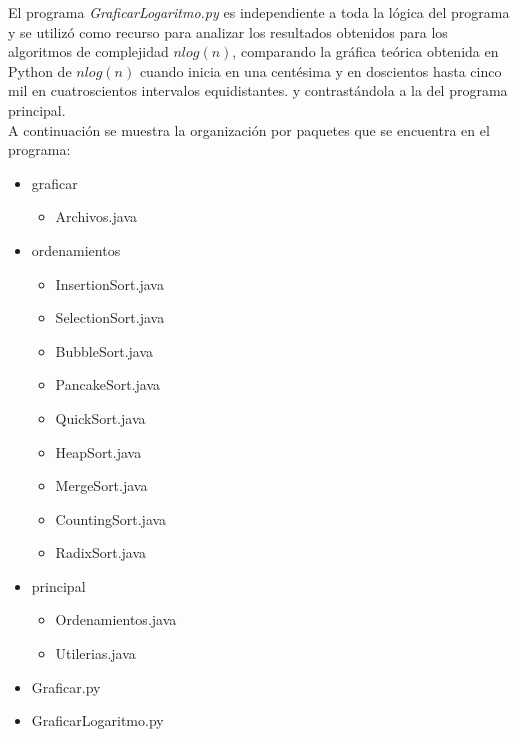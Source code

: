 \documentclass[a4paper,12pt]{article}
\begin{document}
El programa \textit{GraficarLogaritmo.py} es independiente a toda la lógica del programa y se utilizó como recurso para analizar los resultados obtenidos para los algoritmos de complejidad $n log(n)$, comparando la gráfica teórica obtenida en Python de $n log(n)$ cuando inicia en una centésima y en doscientos hasta cinco mil en cuatroscientos intervalos equidistantes. y contrastándola a la del programa principal.\\

A continuación se muestra la organización por paquetes que se encuentra en el programa:

\begin{center}
    \begin{minipage}{0.6\textwidth}
        \centering
        {\footnotesize
        \begin{itemize}
            \item  graficar  
                \begin{itemize}
                    \item Archivos.java
                \end{itemize}
            \item  ordenamientos  
                \begin{itemize}
                    \item InsertionSort.java
                    \item SelectionSort.java
                    \item BubbleSort.java
                    \item PancakeSort.java
                    \item QuickSort.java
                    \item HeapSort.java
                    \item MergeSort.java
                    \item CountingSort.java
                    \item RadixSort.java
                \end{itemize}
            \item  principal  
                \begin{itemize}
                    \item Ordenamientos.java
                    \item Utilerias.java
                \end{itemize}
            \item Graficar.py
            \item GraficarLogaritmo.py
        \end{itemize}
        }
    \end{minipage}
\end{center}
\end{document}
